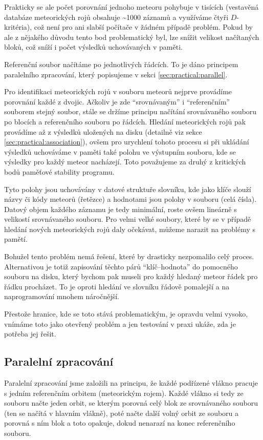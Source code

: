 Prakticky se ale počet porovnání jednoho meteoru pohybuje v tisících (vestavěná databáze meteorických rojů obsahuje \textasciitilde1000 záznamů a využíváme čtyři $D$-kritéria), což není pro ani slabší počítače v žádném případě problém. Pokud by ale z nějakého důvodu tento bod problematický byl, lze snížit velikost načítaných bloků, což sníží i počet výsledků uchovávaných v paměti.

\medskip

Referenční soubor načítáme po jednotlivých řádcích. To je dáno principem paralelního zpracování, který popisujeme v sekci \ref{sec:practical:parallel}.

\medskip

Pro identifikaci meteorických rojů v souboru meteorů nejprve provádíme porovnání každé z dvojic. Ačkoliv je zde "`srovnávaným"' i "`referenčním"' souborem stejný soubor, stále se držíme principu načítání srovnávaného souboru po blocích a referenčního souboru po řádcích. Hledání meteorických rojů pak provádíme až z výsledků uložených na disku (detailně viz sekce \ref{sec:practical:association}), ovšem pro urychlení tohoto procesu si při ukládání výsledků uchováváme v paměti také polohu ve výstupním souboru, kde se výsledky pro každý meteor nacházejí. Toto považujeme za druhý z kritických bodů paměťové stability programu.

\smallskip

Tyto polohy jsou uchovávány v datové struktuře slovníku, kde jako klíče slouží názvy či kódy meteorů (řetězce) a hodnotami jsou polohy v souboru (celá čísla). Datový objem každého záznamu je tedy minimální, roste ovšem lineárně s velikostí srovnávaného souboru. Pro velmi velké soubory, které by se v případě hledání nových meteorických rojů daly očekávat, můžeme narazit na problémy s pamětí.

Bohužel tento problém nemá řešení, které by drasticky nezpomalilo celý proces. Alternativou je totiž zapisování těchto párů "`klíč--hodnota"' do pomocného souboru na disku, který bychom pak museli pro každý hledaný meteor řádek pro řádku procházet. To je oproti hledání ve slovníku řádově pomalejší a na naprogramování mnohem náročnější.

Přestože hranice, kde se toto stává problematickým, je opravdu velmi vysoko, vnímáme toto jako otevřený problém a jen testování v praxi ukáže, zda je potřeba jej řešit.

\subsection{Paralelní zpracování\label{sec:practical:parallel}}%
Paralelní zpracování jsme založili na principu, že každé podřízené vlákno pracuje s jedním referenčním orbitem (meteorickým rojem). Každé vlákno si tedy ze souboru načte jeden orbit, se kterým porovná celý blok ze srovnávaného souboru (ten se načítá v hlavním vlákně), poté načte další volný orbit ze souboru a porovná s ním blok a toto opakuje, dokud nenarazí na konec referenčního souboru.

